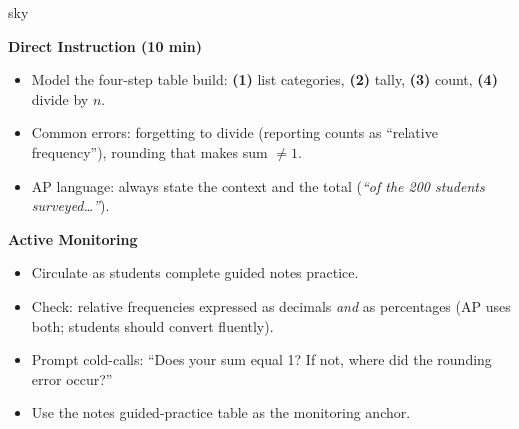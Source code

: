 \documentclass[10pt]{article}
\begin{document}
\begin{skillbox}{sky}
\begin{minipage}[t]{0.48\linewidth}
    \textbf{Direct Instruction (10 min)}
    \begin{itemize}
        \item Model the four-step table build: \textbf{(1)} list categories,
              \textbf{(2)} tally, \textbf{(3)} count, \textbf{(4)} divide by $n$.
        \item Common errors: forgetting to divide (reporting counts as ``relative
              frequency''), rounding that makes sum $\neq 1$.
        \item AP language: always state the context and the total
              (\textit{``of the 200 students surveyed\ldots''}).
    \end{itemize}
\end{minipage}
\hfill
\begin{minipage}[t]{0.48\linewidth}
    \textbf{Active Monitoring}
    \begin{itemize}
        \item Circulate as students complete guided notes practice.
        \item Check: relative frequencies expressed as decimals \textit{and} as
              percentages (AP uses both; students should convert fluently).
        \item Prompt cold-calls: ``Does your sum equal 1? If not, where did the
              rounding error occur?''
        \item Use the notes guided-practice table as the monitoring anchor.
    \end{itemize}
\end{minipage}
\end{skillbox}
\end{document}
